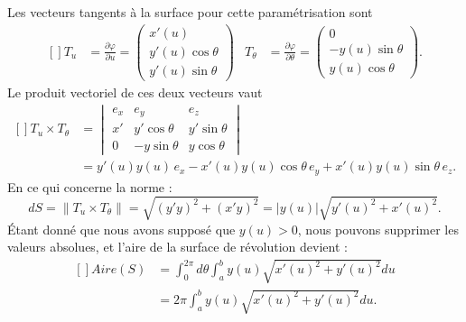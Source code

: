 Les vecteurs tangents à la surface pour cette paramétrisation sont
\begin{equation}
    \begin{aligned}[]
        T_u&=\frac{ \partial \varphi }{ \partial u }=\begin{pmatrix}
            x'(u)    \\ 
            y'(u)\cos\theta    \\ 
            y'(u)\sin\theta    
        \end{pmatrix}&
        T_{\theta}&=\frac{ \partial \varphi }{ \partial \theta }=\begin{pmatrix}
            0    \\ 
            -y(u)\sin\theta    \\ 
            y(u)\cos\theta    
        \end{pmatrix}.
    \end{aligned}
\end{equation}
Le produit vectoriel de ces deux vecteurs vaut
\begin{equation}
    \begin{aligned}[]
        T_u\times T_{\theta}&=\begin{vmatrix}
            e_x    &   e_y    &   e_z    \\
            x'    &   y'\cos\theta    &   y'\sin\theta    \\
            0    &   -y\sin\theta    &   y\cos\theta
        \end{vmatrix}\\
        &=y'(u)y(u)\,e_x-x'(u)y(u)\cos\theta\, e_y+x'(u)y(u)\sin\theta\, e_z.
    \end{aligned}
\end{equation}
En ce qui concerne la norme :
\begin{equation}
    dS=\| T_u\times T_{\theta} \|=\sqrt{(y'y)^2+(x'y)^2}=| y(u) |\sqrt{y'(u)^2+x'(u)^2}.
\end{equation}
Étant donné que nous avons supposé que $y(u)>0$, nous pouvons supprimer les valeurs absolues, et l'aire de la surface de révolution devient :
\begin{equation}
    \begin{aligned}[]
        Aire(S)&=\int_0^{2\pi}d\theta\int_a^b y(u)\sqrt{x'(u)^2+y'(u)^2}du\\
        &=2\pi\int_a^b y(u)\sqrt{x'(u)^2+y'(u)^2}du.
    \end{aligned}
\end{equation}

